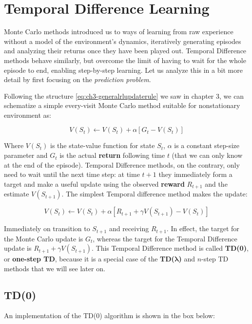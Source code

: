 \section{Temporal Difference Learning}
Monte Carlo methods introduced us to ways of learning from raw experience without a model of the environment’s dynamics, iteratively generating episodes and analyzing their returns once they have been played out. Temporal Difference methods behave similarly, but overcome the limit of having to wait for the whole episode to end, enabling step-by-step learning. Let us analyze this in a bit more detail by first focusing on the \textit{prediction problem}.

Following the structure \eqref{eq:ch3-generalrlupdaterule} we saw in chapter 3, we can schematize a simple every-visit Monte Carlo method suitable for nonstationary environment as:

\begin{equation*}
    V(S_t) \leftarrow V(S_t) + \alpha \left[ G_t - V(S_t) \right]
\end{equation*}

Where $V(S_t)$ is the state-value function for state $S_t$, $\alpha$ is a constant step-size parameter and $G_t$ is the actual \textbf{return} following time $t$ (that we can only know at the end of the episode). Temporal Difference methods, on the contrary, only need to wait until the next time step: at time $t+1$ they immediately form a target and make a useful update using the observed \textbf{reward} $R_{t+1}$ and the estimate $V(S_{t+1})$. The simplest Temporal difference method makes the update:

\begin{equation}
    V(S_t) \leftarrow V(S_t) + \alpha \left[ R_{t+1} + \gamma V(S_{t+1}) - V(S_t) \right]
    \label{eq:ch5-genericonpolicytdupdate}
\end{equation}

Immediately on transition to $S_{t+1}$ and receiving $R_{t+1}$. In effect, the target for the Monte Carlo update is $G_t$, whereas the target for the Temporal Difference update is $R_{t+1} + \gamma V(S_{t+1})$. This Temporal Difference method is called \textbf{TD(0)}, or \textbf{one-step TD}, because it is a special case of the \textbf{TD(}$\boldsymbol{\lambda}$\textbf{)} and $n$-step TD methods that we will see later on.

\subsection{TD(0)}
An implementation of the TD(0) algorithm is shown in the box below:

